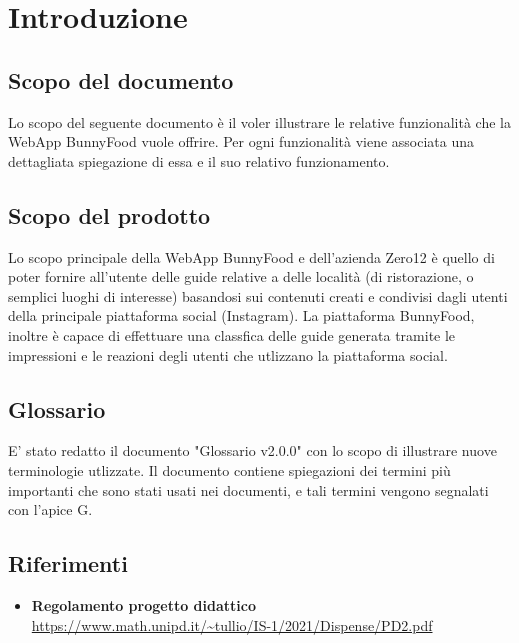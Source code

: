 \section{Introduzione}

\subsection{Scopo del documento}
Lo scopo del seguente documento è il voler illustrare
le relative funzionalità che la WebApp BunnyFood vuole offrire.
Per ogni funzionalità viene associata una dettagliata spiegazione di essa e
il suo relativo funzionamento.

\subsection{Scopo del prodotto}
Lo scopo principale della WebApp BunnyFood e dell'azienda Zero12 è quello di poter fornire all'utente delle guide
relative a delle località (di ristorazione, o semplici luoghi di interesse) basandosi sui contenuti creati e condivisi dagli utenti
della principale piattaforma social (Instagram). 
La piattaforma BunnyFood, inoltre è capace di effettuare una classfica delle guide generata tramite le impressioni e le reazioni degli utenti 
che utlizzano la piattaforma social.

\subsection{Glossario}
E' stato redatto il documento "Glossario v2.0.0" con lo scopo di illustrare nuove terminologie utlizzate.
Il documento contiene spiegazioni dei termini più importanti che sono stati usati nei documenti, e tali termini
vengono segnalati con l'apice G.

\subsection{Riferimenti}
\begin{itemize}
	\item
	{\textbf{Regolamento progetto didattico}}\\\url{https://www.math.unipd.it/~tullio/IS-1/2021/Dispense/PD2.pdf}

\end{itemize}
